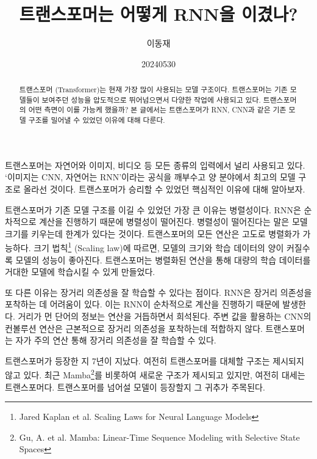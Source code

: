 \documentclass[11pt, oneside]{article}   	%
\title{트랜스포머는 어떻게 RNN을 이겼나?}
\author{이동재}
\date{20240530}
\begin{document}
\maketitle


\begin{abstract}
  트랜스포머 (Transformer)는 현재 가장 많이 사용되는 모델 구조이다. 트랜스포머는 기존 모델들이 보여주던 성능을 압도적으로 뛰어넘으면서 다양한 작업에 사용되고 있다. 트랜스포머의 어떤 측면이 이를 가능케 했을까? 본 글에서는 트랜스포머가 RNN, CNN과 같은 기존 모델 구조를 밀어낼 수 있었던 이유에 대해 다룬다.
\end{abstract}
트랜스포머는 자연어와 이미지, 비디오 등 모든 종류의 입력에서 널리 사용되고 있다. `이미지는 CNN, 자연어는 RNN'이라는 공식을 깨부수고 양 분야에서 최고의 모델 구조로 올라선 것이다. 트랜스포머가 승리할 수 있었던 핵심적인 이유에 대해 알아보자.

트랜스포머가 기존 모델 구조를 이길 수 있었던 가장 큰 이유는 병렬성이다. RNN은 순차적으로 계산을 진행하기 때문에 병렬성이 떨어진다. 병렬성이 떨어진다는 말은 모델 크기를 키우는데 한계가 있다는 것이다. 트랜스포머의 모든 연산은 고도로 병렬화가 가능하다. 크기 법칙\footnote{Jared Kaplan et al. Scaling Laws for Neural Language Models} (Scaling law)에 따르면, 모델의 크기와 학습 데이터의 양이 커질수록 모델의 성능이 좋아진다. 트랜스포머는 병렬화된 연산을 통해 대량의 학습 데이터를 거대한 모델에 학습시킬 수 있게 만들었다.

또 다른 이유는 장거리 의존성을 잘 학습할 수 있다는 점이다. RNN은 장거리 의존성을 포착하는 데 어려움이 있다. 이는 RNN이 순차적으로 계산을 진행하기 때문에 발생한다. 거리가 먼 단어의 정보는 연산을 거듭하면서 희석된다. 주변 값을 활용하는 CNN의 컨볼루션 연산은 근본적으로 장거리 의존성을 포착하는데 적합하지 않다. 트랜스포머는 자가 주의 연산 통해 장거리 의존성을 잘 학습할 수 있다.

트랜스포머가 등장한 지 7년이 지났다. 여전히 트랜스포머를 대체할 구조는 제시되지 않고 있다. 최근 Mamba\footnote{Gu, A. et al. Mamba: Linear-Time Sequence Modeling with Selective State Spaces}를 비롯하여 새로운 구조가 제시되고 있지만, 여전히 대세는 트랜스포머다. 트랜스포머를 넘어설 모델이 등장할지 그 귀추가 주목된다.
\end{document}

